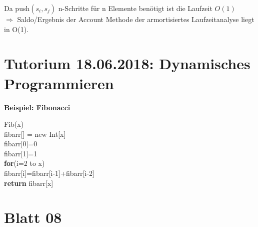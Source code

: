 \documentclass[paper=a4, fontsize=11pt]{scrartcl}
\numberwithin{equation}{section}
\numberwithin{figure}{section}
\numberwithin{table}{section}
\begin{document}
Da push$(s_{i},s_{j})$ n-Schritte für n Elemente benötigt ist die Laufzeit $O(1)$ \\
$\Rightarrow$ Saldo/Ergebnis der Account Methode der armortisiertes Laufzeitanalyse liegt in O(1).

\newpage
\section{Tutorium 18.06.2018: Dynamisches Programmieren}

\textbf{Beispiel: Fibonacci}

\begin{algorithm}[H]
\SetAlgoLined
Fib(x) \\
fibarr[] = new Int[x] \\
fibarr[0]=0 \\
fibarr[1]=1 \\
\textbf{for}(i=2 to x) \\
      fibarr[i]=fibarr[i-1]+fibarr[i-2] \\
\textbf{return} fibarr[x]      
\end{algorithm}

\newpage
\section{Blatt 08}


\end{document}
